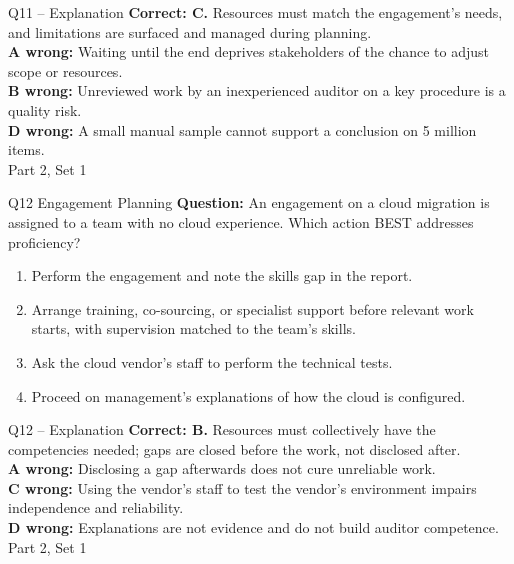 \documentclass[aspectratio=169,10pt]{beamer}
\begin{document}
\begin{frame}[t]{Q11 -- Explanation}
	\footnotesize
	\textbf{Correct: C.} Resources must match the engagement's needs, and limitations are surfaced and managed during planning. \\[5pt]
\textbf{A wrong:} Waiting until the end deprives stakeholders of the chance to adjust scope or resources. \\[3pt]
\textbf{B wrong:} Unreviewed work by an inexperienced auditor on a key procedure is a quality risk. \\[3pt]
\textbf{D wrong:} A small manual sample cannot support a conclusion on 5 million items. \\[3pt]
	\vfill {\tiny Part 2, Set 1}
\end{frame}
\begin{frame}[t]{Q12 \hfill {\scriptsize Engagement Planning}}
	\small
	\textbf{Question:} An engagement on a cloud migration is assigned to a team with no cloud experience. Which action BEST addresses proficiency?
	\begin{enumerate}[label=\Alph*.,itemsep=1pt,topsep=3pt]
			\item Perform the engagement and note the skills gap in the report.
			\item Arrange training, co-sourcing, or specialist support before relevant work starts, with supervision matched to the team's skills.
			\item Ask the cloud vendor's staff to perform the technical tests.
			\item Proceed on management's explanations of how the cloud is configured.
	\end{enumerate}
\end{frame}
\begin{frame}[t]{Q12 -- Explanation}
	\footnotesize
	\textbf{Correct: B.} Resources must collectively have the competencies needed; gaps are closed before the work, not disclosed after. \\[5pt]
\textbf{A wrong:} Disclosing a gap afterwards does not cure unreliable work. \\[3pt]
\textbf{C wrong:} Using the vendor's staff to test the vendor's environment impairs independence and reliability. \\[3pt]
\textbf{D wrong:} Explanations are not evidence and do not build auditor competence. \\[3pt]
	\vfill {\tiny Part 2, Set 1}
\end{frame}
\end{document}

